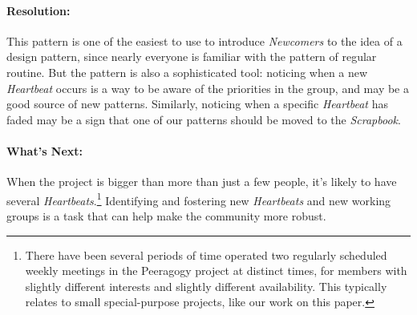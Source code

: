 \paragraph{Resolution:} This pattern is one of the easiest to use to introduce \emph{Newcomers} to the idea of a design pattern, since nearly everyone is familiar with the pattern of regular routine.  But the pattern is also a sophisticated tool: noticing when a new \emph{Heartbeat} occurs is a way to be aware of the priorities in the group, and may be a good source of new patterns.  Similarly, noticing when a specific \emph{Heartbeat} has faded may be a sign that one of our patterns should be moved to the \emph{Scrapbook}.

\paragraph{What's Next:} When the project is bigger than more than just a few people, it's likely to have several \emph{Heartbeats}.\footnote{There have been several periods of time operated two regularly scheduled weekly meetings in the Peeragogy project at distinct times, for members with slightly different interests and slightly different availability.  This typically relates to small special-purpose projects, like our work on this paper.}  Identifying and fostering new \emph{Heartbeats} and new working groups is a task that can help make the community more robust.
